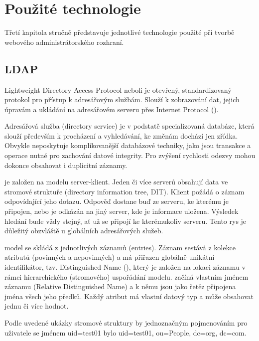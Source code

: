 \chapter{Použité technologie}
\label{3-technologie}

Třetí kapitola stručně představuje jednotlivé technologie použité při
tvorbě webového administrátorského rozhraní.

\section{LDAP}

Lightweight Directory Access Protocol neboli  je otevřený, standardizovaný protokol pro přístup k adresářovým službám. Slouží k zobrazování dat, jejich úpravám a ukládání na adresářovém serveru přes Internet Protocol ().

Adresářová služba (directory service) je v podstatě specializovaná databáze, která slouží především k procházení a vyhledávání, ke změnám dochází jen zřídka. Obvykle neposkytuje komplikovanější databázové techniky, jako jsou transakce a operace nutné pro zachování datové integrity. Pro zvýšení rychlosti odezvy mohou dokonce obsahovat i duplicitní záznamy.

 je založen na modelu server-klient. Jeden či více  serverů obsahují data ve stromové struktuře (directory information tree, DIT). Klient požádá o záznam odpovídající jeho dotazu. Odpověď dostane buď ze serveru, ke kterému je připojen, nebo je odkázán na jiný server, kde je informace uložena. Výsledek hledání bude vždy stejný, ať už se připojí ke kterémukoliv serveru. Tento rys je důležitý obzvláště u globálních adresářových služeb.

 model se skládá z jednotlivých záznamů (entries). Záznam sestává z kolekce atributů (povinných a nepovinných) a má přiřazen globálně unikátní identifikátor, tzv. Distinguished Name (), který je založen na lokaci záznamu v rámci hierarchického (stromového) uspořádání modelu.  začíná vlastním jménem záznamu (Relative Distinguished Name) a k němu jsou jako řetěz připojena jména všech jeho předků. Každý atribut má vlastní datový typ a může obsahovat jednu či více hodnot.

Podle uvedené ukázky stromové struktury by jednoznačným pojmenováním pro uživatele se jménem \textsf{uid=test01} bylo  \textsf{uid=test01, ou=People, dc=org, dc=com}.

